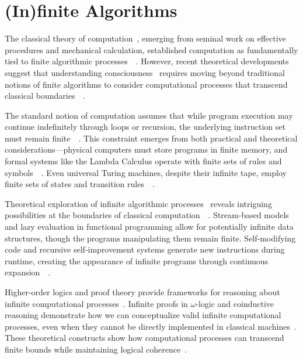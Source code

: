 \section{(In)finite Algorithms~}

The classical theory of computation~, emerging from seminal work on effective procedures and mechanical calculation, established computation as fundamentally tied to finite algorithmic processes~~\cite{Davis2000,turing1936computable,putnam1967psychological}. However, recent theoretical developments suggest that understanding consciousness~ requires moving beyond traditional notions of finite algorithms to consider computational processes that transcend classical boundaries~~\cite{Downey2010,hofstadter1999godel,abramsky2011sheaf}.

The standard notion of computation assumes that while program execution may continue indefinitely through loops or recursion, the underlying instruction set must remain finite~~\cite{Rogers1987,marr2010vision,fodor1980special}. This constraint emerges from both practical and theoretical considerations—physical computers must store programs in finite memory, and formal systems like the Lambda Calculus operate with finite sets of rules and symbols~~\cite{Barendregt1984,anderson2024physical}. Even universal Turing machines, despite their infinite tape, employ finite sets of states and transition rules~~\cite{harnad1990symbol,chalmers1997conscious}.

Theoretical exploration of infinite algorithmic processes~ reveals intriguing possibilities at the boundaries of classical computation~~\cite{Hamkins2014,varela1996neurophenomenology,putnam1988representation}. Stream-based models and lazy evaluation in functional programming allow for potentially infinite data structures, though the programs manipulating them remain finite. Self-modifying code and recursive self-improvement systems generate new instructions during runtime, creating the appearance of infinite programs through continuous expansion~~\cite{Goldin2006,juarrero2023context}.

Higher-order logics and proof theory provide frameworks for reasoning about infinite computational processes~\cite{Mancosu2008,abramsky2012logical,goff2019galileo}. Infinite proofs in $\omega$-logic and coinductive reasoning demonstrate how we can conceptualize valid infinite computational processes, even when they cannot be directly implemented in classical machines~\cite{Boolos2007,hales2022electromagnetism}. These theoretical constructs show how computational processes can transcend finite bounds while maintaining logical coherence~\cite{Freeman2006nonlinear,Magnasco1997}.

